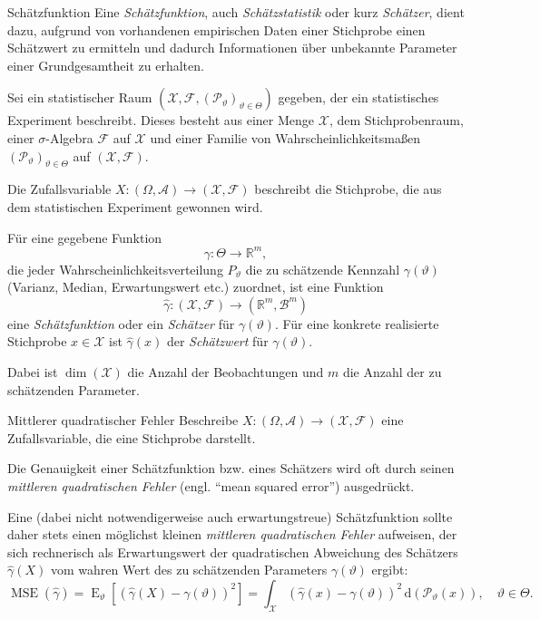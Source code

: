 \begin{defi}{Schätzfunktion}
    Eine \emph{Schätzfunktion}, auch \emph{Schätzstatistik} oder kurz \emph{Schätzer}, dient dazu, aufgrund von vorhandenen empirischen Daten einer Stichprobe einen Schätzwert zu ermitteln und dadurch Informationen über unbekannte Parameter einer Grundgesamtheit zu erhalten.

    Sei ein statistischer Raum $(\mathcal{X}, \mathcal{F}, (\mathcal{P}_{\vartheta})_{\vartheta \in \Theta})$ gegeben, der ein statistisches Experiment beschreibt.
    Dieses besteht aus einer Menge $\mathcal{X}$, dem Stichprobenraum, einer $\sigma$-Algebra $\mathcal{F}$ auf $\mathcal{X}$ und einer Familie von Wahrscheinlichkeitsmaßen $(\mathcal{P}_{\vartheta})_{\vartheta \in \Theta}$ auf $(\mathcal{X}, \mathcal{F})$.

    Die Zufallsvariable $X: (\Omega, \mathcal{A}) \to (\mathcal{X}, \mathcal{F})$ beschreibt die Stichprobe, die aus dem statistischen Experiment gewonnen wird.

    Für eine gegebene Funktion
    \[
        \gamma: \Theta \to \mathbb{R}^m,
    \]
    die jeder Wahrscheinlichkeitsverteilung $P_{\vartheta}$ die zu schätzende Kennzahl $\gamma(\vartheta)$ (Varianz, Median, Erwartungswert etc.) zuordnet, ist eine Funktion
    \[
        \hat{\gamma}: (\mathcal{X}, \mathcal{F}) \to (\mathbb{R}^m, \mathcal{B}^m)
    \]
    eine \emph{Schätzfunktion} oder ein \emph{Schätzer} für $\gamma(\vartheta)$.
    Für eine konkrete realisierte Stichprobe $x \in \mathcal{X}$ ist $\hat{\gamma}(x)$ der \emph{Schätzwert} für $\gamma(\vartheta)$.

    Dabei ist $\dim(\mathcal{X})$ die Anzahl der Beobachtungen und $m$ die Anzahl der zu schätzenden Parameter.
\end{defi}

\begin{defi}{Mittlerer quadratischer Fehler}
    Beschreibe $X: (\Omega, \mathcal{A}) \to (\mathcal{X}, \mathcal{F})$ eine Zufallsvariable, die eine Stichprobe darstellt.

    Die Genauigkeit einer Schätzfunktion bzw. eines Schätzers wird oft durch seinen \emph{mittleren quadratischen Fehler} (engl. \enquote{mean squared error}) ausgedrückt.

    Eine (dabei nicht notwendigerweise auch erwartungstreue) Schätzfunktion sollte daher stets einen möglichst kleinen \emph{mittleren quadratischen Fehler} aufweisen, der sich rechnerisch als Erwartungswert der quadratischen Abweichung des Schätzers $\hat{\gamma}(X)$ vom wahren Wert des zu schätzenden Parameters $\gamma(\vartheta)$ ergibt:
    \[
        \operatorname{MSE}(\hat{\gamma}) = \operatorname{E}_{\vartheta}[(\hat{\gamma}(X) - \gamma(\vartheta))^2] = \int_{\mathcal{X}} (\hat{\gamma}(x) - \gamma(\vartheta))^2 \, \mathrm{d} (\mathcal{P}_{\vartheta}(x)), \quad \vartheta \in \Theta.
    \]
\end{defi}

